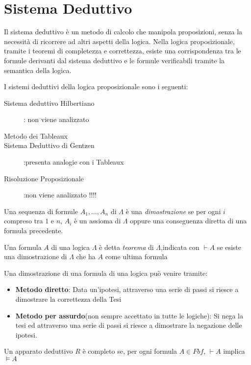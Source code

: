 \section{Sistema Deduttivo}
Il sistema deduttivo è un metodo di calcolo che manipola proposizioni, senza la
necessità di ricorrere ad altri aspetti della logica.\newline
Nella logica proposizionale, tramite i teoremi di completezza e correttezza, esiste
una corrispondenza tra le formule derivanti dal sistema deduttivo e le formule verificabili
tramite la semantica della logica.

I sistemi deduttivi della logica proposizionale sono i seguenti:
\begin{description}
    \item[Sistema deduttivo Hilbertiano]: non viene analizzato
    \item[Metodo dei Tableaux]
    \item[Sistema Deduttivo di Gentzen]:presenta analogie con i Tableaux
    \item [Risoluzione Proposizionale]:non viene analizzato !!!!
\end{description}

\begin{defi}
Una sequenza di formule $A_1,\dots,A_n$ di $\Lambda$ è una \emph{dimostrazione} se
per ogni $i$ compreso tra $1$ e $n$, $A_i$ è un assioma di $\Lambda$ oppure una
conseguenza diretta di una formula precedente.
\end{defi}

\begin{defi}
Una formula $A$ di una logica $\Lambda$ è detta \emph{teorema} di $\Lambda$,indicata
con $\vdash A$ se esiste una dimostrazione di $\Lambda$ che ha $A$ come ultima formula
\end{defi}

Una dimostrazione di una formula di una logica può venire tramite:
\begin{itemize}
  \item  \textbf{Metodo diretto}: Data un'ipotesi, attraverso una serie di passi
          si riesce a dimostrare la correttezza della Tesi
  \item \textbf{Metodo per assurdo}(non sempre accettato in tutte le logiche):
        Si nega la tesi ed attraverso una serie di passi si riesce a dimostrare
        la negazione delle ipotesi.
\end{itemize}

\begin{thm}
    Un apparato deduttivo $R$ è completo se, per ogni formula $A \in Fbf$, $\vdash A$
    implica $\models A$
\end{thm}

